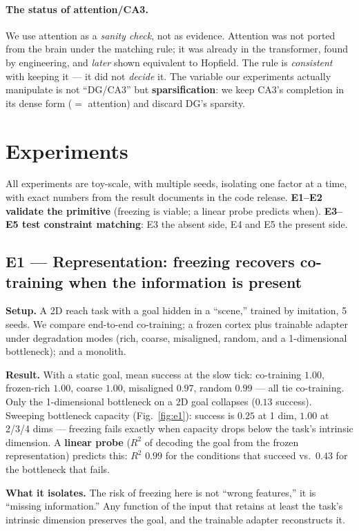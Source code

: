 \documentclass[11pt]{article}
\begin{document}
\paragraph{The status of attention/CA3.} We use attention as a \emph{sanity check}, not as evidence. Attention was not ported from the brain under the matching rule; it was already in the transformer, found by engineering, and \emph{later} shown equivalent to Hopfield. The rule is \emph{consistent} with keeping it --- it did not \emph{decide} it. The variable our experiments actually manipulate is not ``DG/CA3'' but \textbf{sparsification}: we keep CA3's completion in its dense form ($=$ attention) and discard DG's sparsity.

\section{Experiments}
All experiments are toy-scale, with multiple seeds, isolating one factor at a time, with exact numbers from the result documents in the code release. \textbf{E1--E2 validate the primitive} (freezing is viable; a linear probe predicts when). \textbf{E3--E5 test constraint matching}: E3 the absent side, E4 and E5 the present side.

\subsection{E1 --- Representation: freezing recovers co-training when the information is present}
\textbf{Setup.} A 2D reach task with a goal hidden in a ``scene,'' trained by imitation, 5 seeds. We compare end-to-end co-training; a frozen cortex plus trainable adapter under degradation modes (rich, coarse, misaligned, random, and a 1-dimensional bottleneck); and a monolith.

\textbf{Result.} With a static goal, mean success at the slow tick: co-training $1.00$, frozen-rich $1.00$, coarse $1.00$, misaligned $0.97$, random $0.99$ --- all tie co-training. Only the 1-dimensional bottleneck on a 2D goal collapses ($0.13$ success). Sweeping bottleneck capacity (Fig.~\ref{fig:e1}): success is $0.25$ at 1 dim, $1.00$ at 2/3/4 dims --- freezing fails exactly when capacity drops below the task's intrinsic dimension. A \textbf{linear probe} ($R^2$ of decoding the goal from the frozen representation) predicts this: $R^2$ $0.99$ for the conditions that succeed vs.\ $0.43$ for the bottleneck that fails.

\textbf{What it isolates.} The risk of freezing here is not ``wrong features,'' it is ``missing information.'' Any function of the input that retains at least the task's intrinsic dimension preserves the goal, and the trainable adapter reconstructs it.
\end{document}
